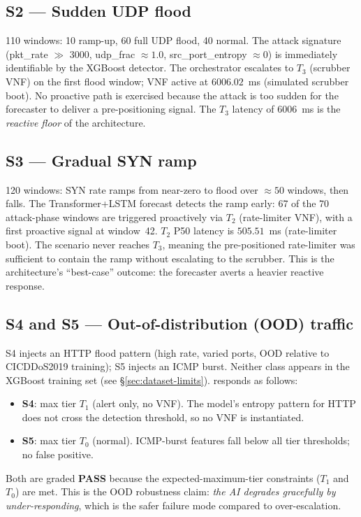 \subsection{S2 — Sudden UDP flood}
\label{sec:s2}
110 windows: 10 ramp-up, 60 full UDP flood, 40 normal.
The attack signature (pkt\_rate $\gg$ 3000, udp\_frac $\approx 1.0$,
src\_port\_entropy $\approx 0$) is immediately identifiable by the
XGBoost detector. The orchestrator escalates to $T_3$ (scrubber VNF)
on the first flood window; VNF active at $6006.02$~ms (simulated
scrubber boot). No proactive path is exercised because the attack is
too sudden for the forecaster to deliver a pre-positioning signal.
The $T_3$ latency of 6006~ms is the \emph{reactive floor} of the
architecture.

\subsection{S3 — Gradual SYN ramp}
\label{sec:s3}
120 windows: SYN rate ramps from near-zero to flood over $\approx 50$
windows, then falls. The Transformer+LSTM forecast detects the ramp
early: 67 of the 70 attack-phase windows are triggered proactively
via $T_2$ (rate-limiter VNF), with a first proactive signal at window~42.
$T_2$ P50 latency is $505.51$~ms (rate-limiter boot). The scenario
never reaches $T_3$, meaning the pre-positioned rate-limiter was
sufficient to contain the ramp without escalating to the scrubber.
This is the architecture's ``best-case'' outcome: the forecaster averts
a heavier reactive response.

\subsection{S4 and S5 — Out-of-distribution (OOD) traffic}
\label{sec:s4-s5}
S4 injects an HTTP flood pattern (high rate, varied ports, OOD relative
to CICDDoS2019 training); S5 injects an ICMP burst. Neither class
appears in the XGBoost training set (see \S\ref{sec:dataset-limits}).
\padonap{} responds as follows:
\begin{itemize}
  \item \textbf{S4}: max tier $T_1$ (alert only, no VNF). The model's
        entropy pattern for HTTP does not cross the detection threshold,
        so no VNF is instantiated.
  \item \textbf{S5}: max tier $T_0$ (normal). ICMP-burst features fall
        below all tier thresholds; no false positive.
\end{itemize}
Both are graded \textbf{PASS} because the expected-maximum-tier
constraints ($T_1$ and $T_0$) are met. This is the OOD robustness claim:
\emph{the AI degrades gracefully by under-responding}, which is the safer
failure mode compared to over-escalation.

